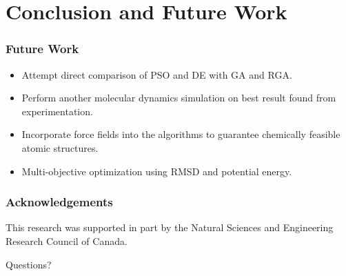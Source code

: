 \documentclass[10pt]{beamer}
\begin{document}
\section{Conclusion and Future Work}




\begin{frame}
	\frametitle{Future Work}

	\begin{itemize}
		\item Attempt direct comparison of PSO and DE with GA and RGA.
		\item Perform another molecular dynamics simulation on best result found from experimentation.
		\item Incorporate force fields into the algorithms to guarantee chemically feasible atomic structures.
		\item Multi-objective optimization using RMSD and potential energy.
	\end{itemize}

\end{frame}

\begin{frame}

	\frametitle{Acknowledgements}

	This research was supported in part by the Natural Sciences and Engineering Research Council of Canada.

\end{frame}

\begin{frame}
	
	\begin{center}
	\Huge Questions?
	\end{center}

\end{frame}
\end{document}
